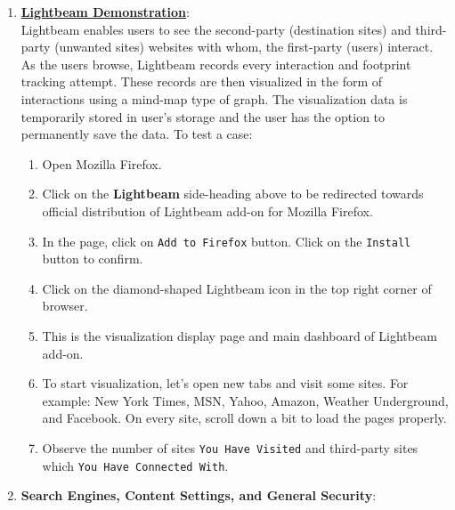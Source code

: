 \documentclass[12pt]{extarticle}
\begin{document}
	\noindent
	\begin{enumerate}
	
	\item	\href{https://addons.mozilla.org/en-US/firefox/addon/lightbeam/}{\textbf{\underline{Lightbeam Demonstration}}}:\\
	Lightbeam enables users to see the second-party (destination sites) and third-party (unwanted sites) websites with whom, the first-party (users) interact. As the users browse, Lightbeam records every interaction and footprint tracking attempt. These records are then visualized in the form of interactions using a mind-map type of graph. The visualization data is temporarily stored in user's storage and the user has the option to permanently save the data. To test a case:
	
	\begin{enumerate}
		\item Open Mozilla Firefox.
		\item Click on the \textbf{Lightbeam} side-heading above to be redirected towards official distribution of Lightbeam add-on for Mozilla Firefox.
		\item In the page, click on \texttt{Add to Firefox} button. Click on the \texttt{Install} button to confirm.
		\item Click on the diamond-shaped Lightbeam icon in the top right corner of browser.
		\item This is the visualization display page and main dashboard of Lightbeam add-on. 
		\item To start visualization, let's open new tabs and visit some sites. For example: New York Times, MSN, Yahoo, Amazon, Weather Underground, and Facebook. On every site, scroll down a bit to load the pages properly.
		\item Observe the number of sites \texttt{You Have Visited} and third-party sites which \texttt{You Have Connected With}.
	\end{enumerate}

	
	
	\vspace{2mm}
	\noindent
	\item	\textbf{Search Engines, Content Settings, and General Security}:
	

\end{enumerate}
\end{document}
